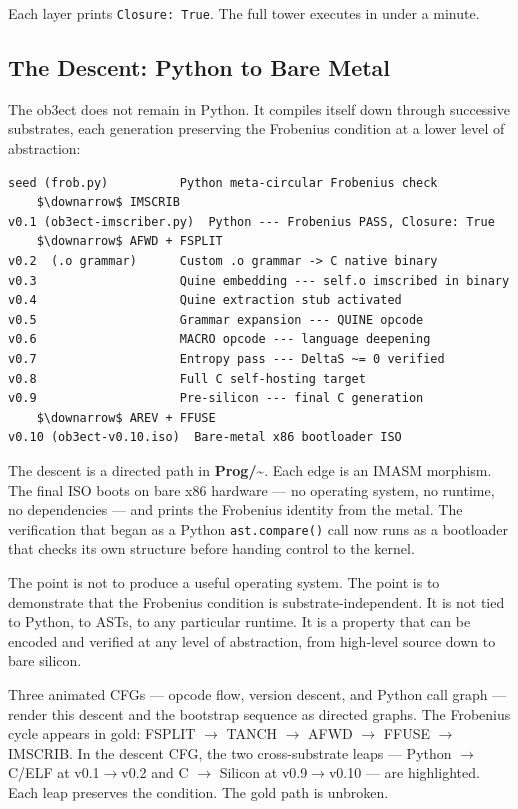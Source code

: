 \documentclass[12pt,a4paper]{article}
\begin{document}
Each layer prints \texttt{Closure: True}. The full tower executes in under a minute.

\subsection{The Descent: Python to Bare Metal}

The ob3ect does not remain in Python. It compiles itself down through successive substrates, each generation preserving the Frobenius condition at a lower level of abstraction:

\begin{lstlisting}
seed (frob.py)          Python meta-circular Frobenius check
    $\downarrow$ IMSCRIB
v0.1 (ob3ect-imscriber.py)  Python --- Frobenius PASS, Closure: True
    $\downarrow$ AFWD + FSPLIT
v0.2  (.o grammar)      Custom .o grammar -> C native binary
v0.3                    Quine embedding --- self.o imscribed in binary
v0.4                    Quine extraction stub activated
v0.5                    Grammar expansion --- QUINE opcode
v0.6                    MACRO opcode --- language deepening
v0.7                    Entropy pass --- DeltaS ~= 0 verified
v0.8                    Full C self-hosting target
v0.9                    Pre-silicon --- final C generation
    $\downarrow$ AREV + FFUSE
v0.10 (ob3ect-v0.10.iso)  Bare-metal x86 bootloader ISO
\end{lstlisting}

The descent is a directed path in \textbf{Prog/\textasciitilde{}}. Each edge is an IMASM morphism. The final ISO boots on bare x86 hardware --- no operating system, no runtime, no dependencies --- and prints the Frobenius identity from the metal. The verification that began as a Python \texttt{ast.compare()} call now runs as a bootloader that checks its own structure before handing control to the kernel.

The point is not to produce a useful operating system. The point is to demonstrate that the Frobenius condition is substrate-independent. It is not tied to Python, to ASTs, to any particular runtime. It is a property that can be encoded and verified at any level of abstraction, from high-level source down to bare silicon.

Three animated CFGs --- opcode flow, version descent, and Python call graph --- render this descent and the bootstrap sequence as directed graphs. The Frobenius cycle appears in gold: FSPLIT $\rightarrow$ TANCH $\rightarrow$ AFWD $\rightarrow$ FFUSE $\rightarrow$ IMSCRIB. In the descent CFG, the two cross-substrate leaps --- Python $\rightarrow$ C/ELF at v0.1$\rightarrow$v0.2 and C $\rightarrow$ Silicon at v0.9$\rightarrow$v0.10 --- are highlighted. Each leap preserves the condition. The gold path is unbroken.
\end{document}
